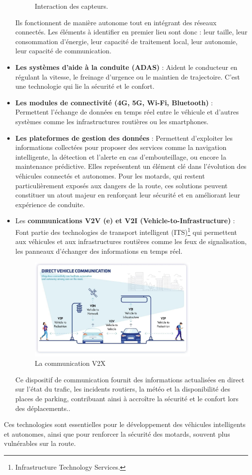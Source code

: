 \begin{itemize}
\begin{figure}[H]
        \caption{Interaction des capteurs.}
    \end{figure}
    Ils fonctionnent de manière autonome tout en intégrant des réseaux connectés. Les éléments à identifier en premier lieu sont donc : leur taille, leur consommation d’énergie, leur capacité de traitement local, leur autonomie, leur capacité de communication.
    \item \textbf{Les systèmes d’aide à la conduite (ADAS)} : Aident le conducteur en régulant la vitesse, le freinage d’urgence ou le maintien de trajectoire. C'est une technologie qui lie la sécurité et le confort.
    \item \textbf{Les modules de connectivité (4G, 5G, Wi-Fi, Bluetooth)} : Permettent l’échange de données en temps réel entre le véhicule et d’autres systèmes comme les infrastructures routières ou les smartphones.
    \item \textbf{Les plateformes de gestion des données} : Permettent d’exploiter les informations collectées pour proposer des services comme la navigation intelligente, la détection et l’alerte en cas d’embouteillage, ou encore la maintenance prédictive. Elles représentent un élément clé dans l’évolution des véhicules connectés et autonomes. Pour les motards, qui restent particulièrement exposés aux dangers de la route, ces solutions peuvent constituer un atout majeur en renforçant leur sécurité et en améliorant leur expérience de conduite.\\
    \item Les \textbf{communications V2V (e) et V2I (Vehicle-to-Infrastructure)} : Font partie des technologies de transport intelligent (ITS)\footnote{Infrastructure Technology Services.} qui permettent aux véhicules et aux infrastructures routières comme les feux de signalisation, les panneaux d’échanger des informations en temps réel.

    \begin{figure}[H]
        \centering
        \includegraphics[width=0.8\textwidth]{images/schema_v2.png} 
        \caption{La communication V2X}
    \end{figure}

Ce dispositif de communication fournit des informations actualisées en direct sur l'état du trafic, les incidents routiers, la météo et la disponibilité des places de parking, contribuant ainsi à accroître la sécurité et le confort lors des déplacements.\cite{joberty_blog}.\\

\end{itemize}
Ces technologies sont essentielles pour le développement des véhicules intelligents et autonomes, ainsi que pour renforcer la sécurité des motards, souvent plus vulnérables sur la route.
\vspace{0.5cm}

